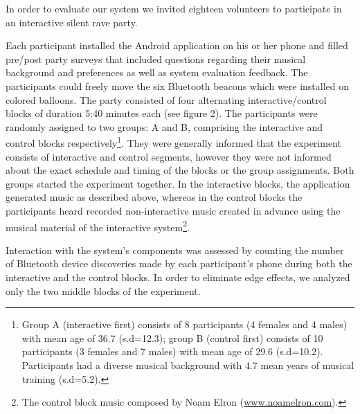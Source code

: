 In order to evaluate our system we invited eighteen volunteers to participate in an interactive silent rave party.

Each participant installed the Android application on his or her phone and filled pre/post party surveys that included questions regarding their musical background and preferences as well as system evaluation feedback. The participants could freely move the six Bluetooth beacons which were installed on colored balloons. The party consisted of four alternating interactive/control blocks of duration 5:40 minutes each (see figure 2). The participants were randomly assigned to two groups: A and B, comprising the interactive and control blocks respectively\footnote{Group A (interactive first) consists of 8 participants (4 females and 4 males) with mean age of 36.7 (s.d=12.3); group B (control first) consists of 10 participants (3 females and 7 males) with mean age of 29.6 (s.d=10.2). Participants had a diverse musical background with 4.7 mean years of musical training (s.d=5.2).}. They were generally informed that the experiment consists of interactive and control segments, however they were not informed about the exact schedule and timing of the blocks or the group assignments. Both groups started the experiment together. In the interactive blocks, the application generated music as described above, whereas in the control blocks the participants heard recorded non-interactive music created in advance using the musical material of the interactive system\footnote{The control block music composed by Noam Elron (\href{http://www.noamelron.com}{www.noamelron.com}).}.

Interaction with the system’s components was assessed by counting the number of Bluetooth device discoveries made by each participant’s phone during both the interactive and the control blocks. In order to eliminate edge effects, we analyzed only the two middle blocks of the experiment.